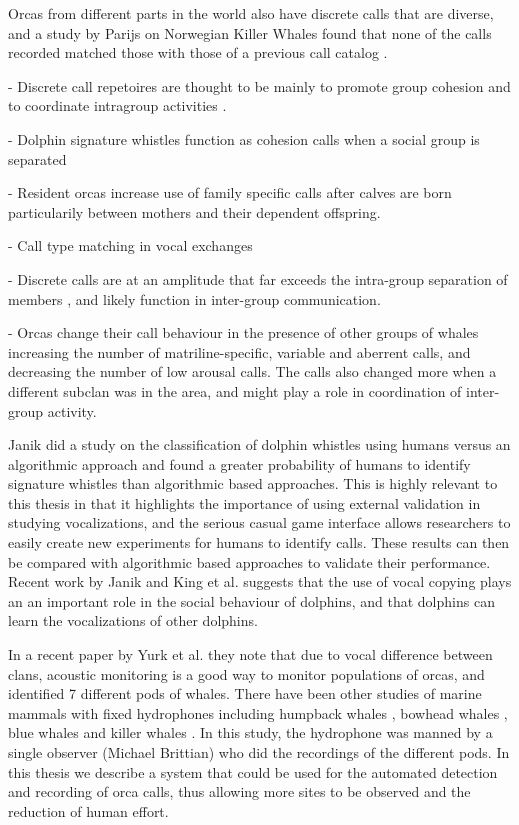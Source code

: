 \documentclass[12pt,oneside]{book}
\begin{document}
Orcas from different parts in the world also have discrete calls that
are diverse, and a study by Parijs \cite{parijs04} on Norwegian Killer
Whales found that none of the calls recorded matched those with those
of a previous call catalog \cite{strager95}.


- Discrete call repetoires are thought to be mainly to promote group
cohesion and to coordinate intragroup activities \cite{ford89}
\cite{ford91}.

- Dolphin signature whistles function as cohesion calls when a social
group is separated \cite{janik98} \cite{watwood05}

- Resident orcas increase use of family specific calls after calves
are born \cite{weiss06} particularily between mothers and their
dependent offspring.

- Call type matching in vocal exchanges \cite{miller04}

- Discrete calls are at an amplitude that far exceeds the intra-group
separation of members \cite{miller06}, and likely function in
inter-group communication. 

- Orcas change their call behaviour in the presence of other groups of
whales \cite{weiss06} increasing the number of matriline-specific,
variable and aberrent calls, and decreasing the number of low arousal
calls.  The calls also changed more when a different subclan was in
the area, and might play a role in coordination of inter-group
activity.

Janik \cite{janik99} did a study on the classification of dolphin
whistles using humans versus an algorithmic approach and found a
greater probability of humans to identify signature whistles than
algorithmic based approaches.  This is highly relevant to this thesis
in that it highlights the importance of using external validation in
studying vocalizations, and the serious casual game interface allows
researchers to easily create new experiments for humans to identify
calls.  These results can then be compared with algorithmic based
approaches to validate their performance.  Recent work by Janik and
King et al. \cite{king2013} suggests that the use of vocal copying
plays an an important role in the social behaviour of dolphins, and
that dolphins can learn the vocalizations of other dolphins.

In a recent paper by Yurk et al. \cite{yurk10} they note that due to
vocal difference between clans, acoustic monitoring is a good way to
monitor populations of orcas, and identified 7 different pods of
whales.  There have been other studies of marine mammals with fixed
hydrophones including humpback whales \cite{norris99}, bowhead whales
\cite{cummings85}, blue whales \cite{stafford98} and killer whales
\cite{morton02}.  In this study, the hydrophone was manned by a single
observer (Michael Brittian) who did the recordings of the different
pods.  In this thesis we describe a system that could be used for the
automated detection and recording of orca calls, thus allowing more
sites to be observed and the reduction of human effort.
\end{document}
